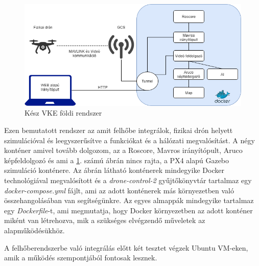 \begin{figure}
	\centering
	\includegraphics[width=\linewidth]{figures/vke_drone.png}
	\caption{Kész VKE földi rendszer}
	\label{fig:vke}
\end{figure}

\noindent
Ezen bemutatott rendszer az amit felhőbe integrálok, fizikai drón helyett szimulációval és leegyszerűsítve a funkciókat és a hálózati megvalósítást. A négy konténer amivel tovább dolgozom, az a Roscore, Mavros irányítópult, Aruco képfeldolgozó és ami a \ref{fig:vke}. számú ábrán nincs rajta, a PX4 alapú Gazebo szimuláció konténere. Az ábrán látható konténerek mindegyike Docker technológiával megvalósított és a \emph{drone-control-2} gyűjtőkönyvtár tartalmaz egy \emph{docker-compose.yml} fájlt, ami az adott konténerek más környezetben való összehangolásában van segítségünkre. Az egyes almappák mindegyike tartalmaz egy \emph{Dockerfile}-t, ami megmutatja, hogy Docker környezetben az adott konténer miként van létrehozva, mik a szükséges elvégzendő műveletek az alapműködésükhöz.

A felhőberendszerbe való integrálás előtt két tesztet végzek Ubuntu VM-eken, amik a működés szempontjából fontosak lesznek.
